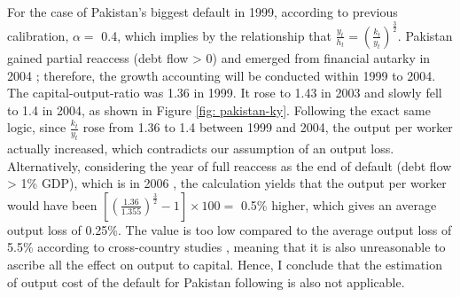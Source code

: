 For the case of Pakistan's biggest default in 1999, according to previous calibration, $\alpha=$ 0.4, which implies by the relationship that $\frac{y_t}{h_t} = \left( \frac{k_t}{y_t} \right)^{\frac{3}{2}}$.
Pakistan gained partial reaccess (debt flow > 0) and emerged from financial autarky in 2004 \citep{trebesch-2011-sovereign}; therefore, the growth accounting will be conducted within 1999 to 2004.
The capital-output-ratio was 1.36 in 1999. It rose to 1.43 in 2003 and slowly fell to 1.4 in 2004, as shown in Figure \ref{fig: pakistan-ky}.
Following the exact same logic, since $\frac{k_t}{y_t}$ rose from 1.36 to 1.4 between 1999 and 2004, the output per worker actually increased, which contradicts our assumption of an output loss.
Alternatively, considering the year of full reaccess as the end of default (debt flow > 1\% GDP), which is in 2006 \citep{trebesch-2011-sovereign}, the calculation yields that the output per worker would have been $ \left[\left(\frac{1.36}{1.355} \right)^{\frac{3}{2}} -1\right]\times 100 = $ 0.5\% higher, which gives an average output loss of 0.25\%. The value is too low compared to the average output loss of 5.5\% according to cross-country studies \citep{Uribe-Schmitt-Grohe-textbook,Borensztein-Panizza-defualt-cost}, meaning that it is also unreasonable to ascribe all the effect on output to capital.
Hence, I conclude that the estimation of output cost of the default for Pakistan following \citet{zarazaga-12} is also not applicable.


